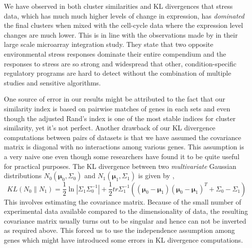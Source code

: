  We have observed in both cluster similarities and KL divergences that stress data, which has much much higher levels of change in expression, has \textit{dominated} the final clusters when mixed with the cell-cycle data where the expression level changes are much lower. This is in line with the observations made by \citet{amos05integrative} in their large scale microarray integration study. They state that two opposite environmental stress responses dominate their entire compendium and the responses to stress are so strong and widespread that other, condition-specific regulatory programs are hard to detect without the combination of multiple studies and sensitive algorithms.  

One source of error in our results might be attributed to the fact that our similarity index is based on pairwise matches of genes in each sets and even though the adjusted Rand's index is one of the most stable indices for cluster similarity, yet it's not perfect. Another drawback of our \ac{KL} divergence computations between pairs of datasets is that we have assumed the covariance matrix is diagonal with no interactions among various genes. This assumption is a very naive one even though some researchers have found it to be quite useful \citep{ernstwit2004statis_microarrays} for practical purposes. The \ac{KL} divergence between two \textit{multivariate} Gaussian distributions $N_{0}(\mathbf{\mu}_{0},\Sigma_{0})$ and $N_{1}(\mathbf{\mu}_{1},\Sigma_{1})$ is given by \citep{kullback1997info},  
\begin{equation}
    KL(\mathit{N}_{0}\parallel \mathit{N}_{1})=\frac{1}{2}\ln |\Sigma_{1}\Sigma_{0}^{-1}|+\frac{1}{2}tr\Sigma_{1}^{-1}((\mathbf{\mu}_{0}-\mathbf{\mu}_{1})(\mathbf{\mu}_{0}-\mathbf{\mu}_{1})^{T}+\Sigma_{0}-\Sigma_{1})
\end{equation}
This involves estimating the covariance matrix. Because of the small number of experimental data available compared to the dimensionality of data, the resulting covariance matrix usually turns out to be singular and hence can not be inverted as required above. This forced us to use the independence assumption among genes which might have introduced some errors in KL divergence computations.

